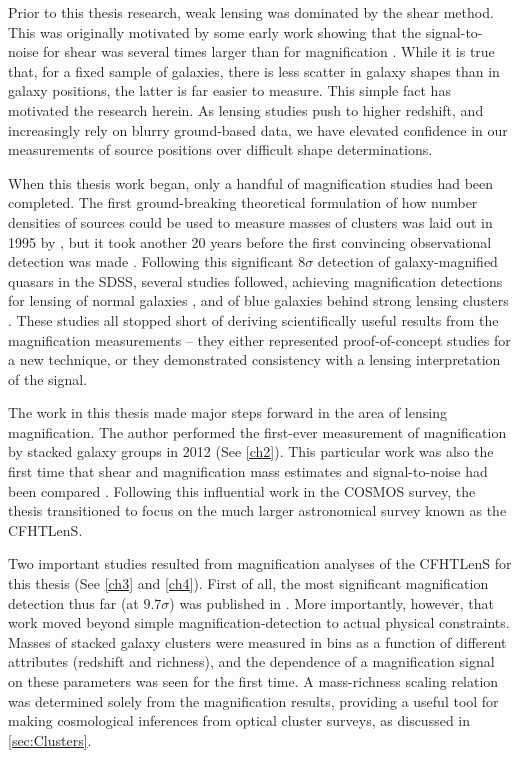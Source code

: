 Prior to this thesis research, weak lensing was dominated by the shear method. This was originally motivated by some early work showing that the signal-to-noise for shear was several times larger than for magnification \citep{Schneider00}. While it is true that, for a fixed sample of galaxies, there is less scatter in galaxy shapes than in galaxy positions, the latter is far easier to measure. This simple fact has motivated the research herein. As lensing studies push to higher redshift, and increasingly rely on blurry ground-based data, we have elevated confidence in our measurements of source positions over difficult shape determinations. 

When this thesis work began, only a handful of magnification studies had been completed. The first ground-breaking theoretical formulation of how number densities of sources could be used to measure masses of clusters was laid out in 1995 by \citet{Broadhurst95}, but it took another 20 years before the first convincing observational detection was made \citep{Scranton05}. Following this significant $8\sigma$ detection of galaxy-magnified quasars in the \ac{SDSS}, several studies followed, achieving magnification detections for lensing of normal galaxies \citep{Hildebrandt09b}, and of blue galaxies behind strong lensing clusters \citep{Umetsu11}. These studies all stopped short of deriving scientifically useful results from the magnification measurements -- they either represented proof-of-concept studies for a new technique, or they demonstrated consistency with a lensing interpretation of the signal.

The work in this thesis made major steps forward in the area of lensing magnification. The author performed the first-ever measurement of magnification by stacked galaxy groups in 2012 (See \autoref{ch2}). This particular work was also the first time that shear and magnification mass estimates and signal-to-noise had been compared \citep{Ford12}. Following this influential work in the \acf{COSMOS} survey, the thesis transitioned to focus on the much larger astronomical survey known as the \acf{CFHTLenS}. 

Two important studies resulted from magnification analyses of the \ac{CFHTLenS} for this thesis (See \autoref{ch3} and \autoref{ch4}). First of all, the most significant magnification detection thus far (at $9.7\sigma$) was published in \citet{Ford14}. More importantly, however, that work moved beyond simple magnification-detection to actual physical constraints. Masses of stacked galaxy clusters were measured in bins as a function of different attributes (redshift and richness), and the dependence of a magnification signal on these parameters was seen for the first time. A mass-richness scaling relation was determined solely from the magnification results, providing a useful tool for making cosmological inferences from optical cluster surveys, as discussed in \autoref{sec:Clusters}. 

